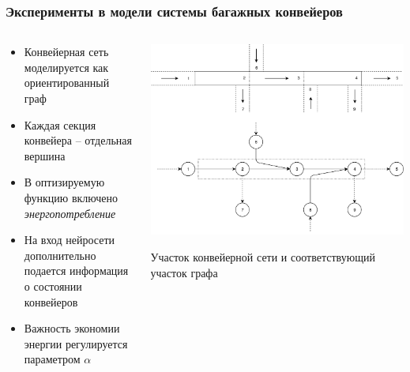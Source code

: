 \documentclass{beamer}
\begin{document}
\begin{frame}
  \frametitle{Эксперименты в модели системы багажных конвейеров}
  \begin{columns}
    \begin{column}{0.5\textwidth} 
      \begin{itemize}
      \item Конвейерная сеть моделируется как ориентированный граф
      \item Каждая секция конвейера -- отдельная вершина
      \item В оптизируемую функцию включено \textit{энергопотребление}
      \item На вход нейросети дополнительно подается информация о состоянии конвейеров
      \item Важность экономии энергии регулируется параметром $\alpha$
      \end{itemize}
    \end{column}
    \begin{column}{0.5\textwidth}
      \includegraphics[width=\textwidth]{belt-illustration}  

      Участок конвейерной сети и соответствующий участок графа
    \end{column}
  \end{columns}
\end{frame}

\end{document}

